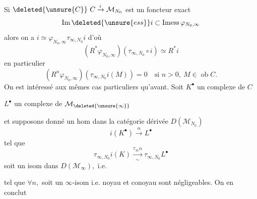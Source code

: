 Si \(\deleted{\unsure{C}}\ C\xrightarrow{i}\mathcal M_{N_0}\) est un foncteur exact
\[
\operatorname{Im}\deleted{\unsure{ess}}i\subset\operatorname{Imess}\varphi_{N_0,\infty}
\]
alors on a \(i\simeq\varphi_{N_0,\infty}\tau_{\infty,N_0}i\) d'où
\[
(R^*\varphi_{N_0,\infty})(\tau_{\infty,N_0}\circ i)\simeq R^*i
\]
en particulier
\[
(R^n\varphi_{N_0,\infty})(\tau_{\infty,N_0}i(M))=0\quad\text{si }n>0,\ M\in\operatorname{ob}C.
\]
On est intéressé aux mêmes cas particuliers qu'avant.
Soit \(K^\bullet\) un complexe de \(C\)

\(L^\bullet\) un complexe de \(\mathcal M_{\deleted{\unsure{\infty}}}\)

et supposons donné un hom dans la catégorie dérivée \(D(\mathcal M_{N_0})\)
\[
i(K^\bullet)\xrightarrow{\alpha}L^\bullet
\]
tel que
\[
\tau_{\infty,N_0}i(K)\xrightarrow[\sim]{\tau_\infty\alpha}\tau_{\infty,N_0}L^\bullet
\]
soit un isom dans \(D(\mathcal M_\infty),\) i.e.

tel que \(\forall n,\)
soit un \(\infty\)-isom i.e. noyau et conoyau sont négligeables. On en conclut
